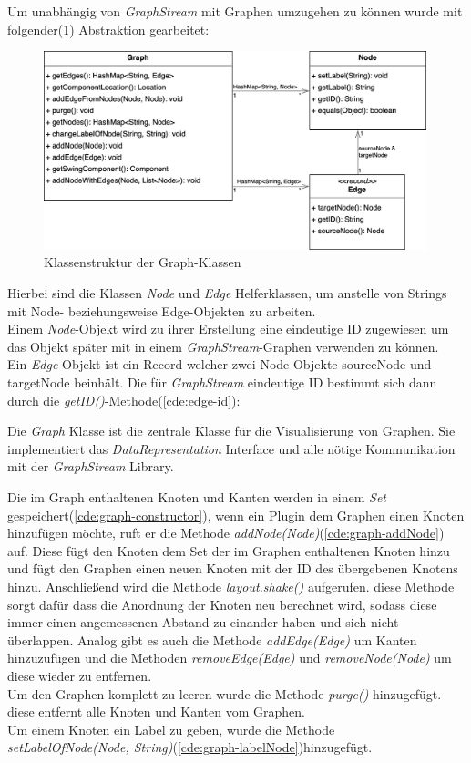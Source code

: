 Um unabhängig von \textit{GraphStream} mit Graphen umzugehen zu können wurde mit
folgender(\cref{fig:graph-classes}) Abstraktion gearbeitet:\\
\begin{figure}[h]
  \centering
  \vspace{-20pt}
  \includegraphics[width=0.99\textwidth]{fig/GUI_Graph_classes_methods.png}
  \caption{Klassenstruktur der Graph-Klassen}%
  \label{fig:graph-classes}
\end{figure}


Hierbei sind die Klassen \textit{Node} und \textit{Edge} Helferklassen, um
anstelle von Strings mit Node- beziehungsweise Edge-Objekten zu arbeiten.\\
Einem \textit{Node}-Objekt wird zu ihrer Erstellung eine eindeutige ID zugewiesen
um das Objekt später mit in einem \textit{GraphStream}-Graphen verwenden zu können.\\
Ein \textit{Edge}-Objekt ist ein Record welcher zwei Node-Objekte
sourceNode und targetNode beinhält. Die für \textit{GraphStream}
eindeutige ID bestimmt sich dann durch die \textit{getID()}-Methode(\cref{cde:edge-id}):

Die \textit{Graph} Klasse ist die zentrale Klasse für die Visualisierung von Graphen.
Sie implementiert das \textit{DataRepresentation} Interface und
alle nötige Kommunikation mit der \textit{GraphStream} Library.

Die im Graph enthaltenen Knoten und Kanten werden in einem \textit{Set} gespeichert(\cref{cde:graph-constructor}),
wenn ein Plugin dem Graphen einen Knoten hinzufügen möchte,
ruft er die Methode \textit{addNode(Node)}(\cref{cde:graph-addNode}) auf.
Diese fügt den Knoten dem Set der im Graphen enthaltenen Knoten hinzu und
fügt den Graphen einen neuen Knoten mit der ID des übergebenen Knotens hinzu.
Anschließend wird die Methode \textit{layout.shake()} aufgerufen.
diese Methode sorgt dafür dass die Anordnung der Knoten neu berechnet wird,
sodass diese immer einen angemessenen Abstand zu einander haben und sich nicht überlappen. 
Analog gibt es auch die Methode \textit{addEdge(Edge)} um Kanten hinzuzufügen
und die Methoden \textit{removeEdge(Edge)} und \textit{removeNode(Node)}
um diese wieder zu entfernen.\\
Um den Graphen komplett zu leeren wurde die Methode \textit{purge()} hinzugefügt.
diese entfernt alle Knoten und Kanten vom Graphen.\\
Um einem Knoten ein Label zu geben, wurde die Methode\\
\textit{setLabelOfNode(Node, String)}(\cref{cde:graph-labelNode})hinzugefügt.


